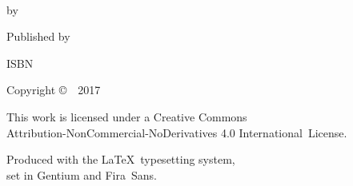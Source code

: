 \cleartoverso
\thispagestyle{empty}

{\copyrightsize
\centering
\setlength{\parindent}{0pt}%
\setlength{\parskip}{0.8\baselineskip}%

\thetitle\\
by \theauthor

Published by \thePublisher

ISBN \theISBN

Copyright \copyright\ \thePublisher\ 2017


\vfill

{\footnotesize

This work is licensed under a Creative Commons\\
Attribution-NonCommercial-NoDerivatives 4.0 International~License.

Produced with the \LaTeX\ typesetting system,\\ set in Gentium and Fira~Sans.

\theEditionInfo

}}
